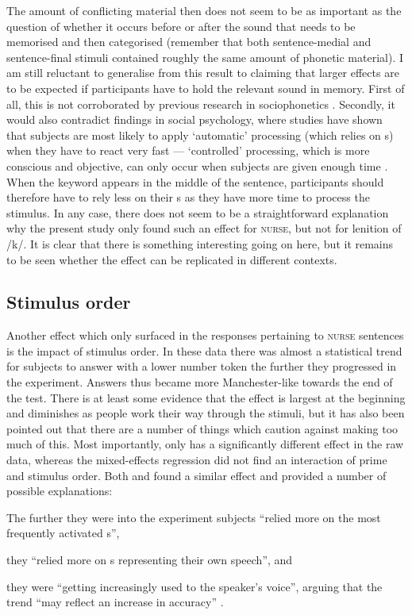 The amount of conflicting material then does not seem to be as important as the question of whether it occurs before or after the sound that needs to be memorised and then categorised (remember that both sentence-medial and sentence-final stimuli contained roughly the same amount of phonetic material).
I am still reluctant to generalise from this result to claiming that larger  effects are to be expected if participants have to hold the relevant sound in memory.
First of all, this is not corroborated by previous research in sociophonetics \parencite{hayetal2006a,haydrager2010}.
Secondly, it would also contradict findings in social psychology, where studies have shown that subjects are most likely to apply `automatic' processing (which relies on s) when they have to react very fast --- `controlled' processing, which is more conscious and objective, can only occur when subjects are given enough time \parencite[cf.][33--34]{petersensix2008}.
When the keyword appears in the middle of the sentence, participants should therefore have to rely less on their s as they have more time to process the stimulus.
In any case, there does not seem to be a straightforward explanation why the present study only found such an effect for \textsc{nurse}, but not for lenition of /k/.
It is clear that there is something interesting going on here, but it remains to be seen whether the effect can be replicated in different contexts.

		\subsection{Stimulus order}

Another effect which only surfaced in the responses pertaining to \textsc{nurse} sentences is the impact of stimulus order.
In these data there was almost a statistical trend for subjects to answer with a lower number token the further they progressed in the experiment.
Answers thus became more Manchester-like towards the end of the test.
There is at least some evidence that the  effect is largest at the beginning and diminishes as people work their way through the stimuli, but it has also been pointed out that there are a number of things which caution against making too much of this.
Most importantly,  only has a significantly different effect in the raw data, whereas the mixed-effects regression did not find an interaction of prime and stimulus order.
Both \textcite{hayetal2006a} and \textcite{haydrager2010} found a similar effect and provided a number of possible explanations:
	\begin{inparaenum}[(1)]
		\item The further they were into the experiment subjects ``relied more on the most frequently activated s'',
		\item they ``relied more on s representing their own speech'', and
		\item they were ``getting increasingly used to the speaker's voice'', arguing that the trend ``may reflect an increase in accuracy'' \parencite[881--882]{haydrager2010}.
	\end{inparaenum}

